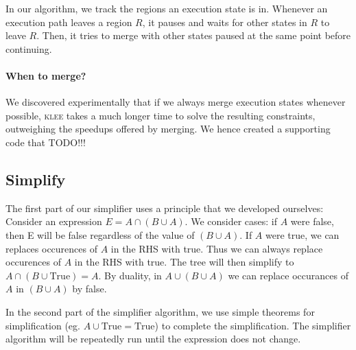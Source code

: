 \documentclass[12pt,a4paper]{article}
\newcommand{\klee}{\textsc{klee }}
\begin{document}
In our algorithm, we track the regions an execution state is in. Whenever an execution path leaves a region $R$, it pauses and waits for other states in $R$ to leave $R$. Then, it tries to merge with other states paused at the same point before continuing.


\paragraph{When to merge?}
We discovered experimentally that if we always merge execution states whenever possible, \klee takes a much longer time to solve the resulting constraints, outweighing the speedups offered by merging. We hence created a supporting code that TODO!!!

\subsection{Simplify}
The first part of our simplifier uses a principle that we developed ourselves:
Consider an expression $E = A\cap(B\cup A)$. We consider cases: if $A$ were false, then E will be false regardless of the value of $(B\cup A)$. If $A$ were true, we can replaces occurences of $A$ in the RHS with true. Thus we can always replace occurences of $A$ in the RHS with true. The tree will then simplify to $A\cap(B\cup \text{True}) = A$. By duality, in $A\cup(B\cup A)$ we can replace occurances of $A$ in $(B\cup A)$ by false.

In the second part of the simplifier algorithm, we use simple theorems for simplification (eg. $A\cup \text{True} = \text{True}$) to complete the simplification. The simplifier algorithm will be repeatedly run until the expression does not change.
\end{document}

